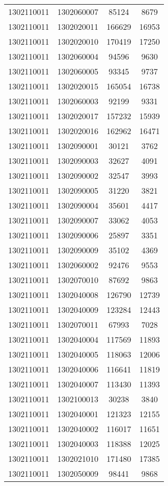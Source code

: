 \begin{longtable}{llcc}
1302110011 & 1302060007 & 85124 & 8679\\
1302110011 & 1302020011 & 166629 & 16953\\
1302110011 & 1302020010 & 170419 & 17250\\
1302110011 & 1302060004 & 94596 & 9630\\
1302110011 & 1302060005 & 93345 & 9737\\
1302110011 & 1302020015 & 165054 & 16738\\
1302110011 & 1302060003 & 92199 & 9331\\
1302110011 & 1302020017 & 157232 & 15939\\
1302110011 & 1302020016 & 162962 & 16471\\
1302110011 & 1302090001 & 30121 & 3762\\
1302110011 & 1302090003 & 32627 & 4091\\
1302110011 & 1302090002 & 32547 & 3993\\
1302110011 & 1302090005 & 31220 & 3821\\
1302110011 & 1302090004 & 35601 & 4417\\
1302110011 & 1302090007 & 33062 & 4053\\
1302110011 & 1302090006 & 25897 & 3351\\
1302110011 & 1302090009 & 35102 & 4369\\
1302110011 & 1302060002 & 92476 & 9553\\
1302110011 & 1302070010 & 87692 & 9863\\
1302110011 & 1302040008 & 126790 & 12739\\
1302110011 & 1302040009 & 123284 & 12443\\
1302110011 & 1302070011 & 67993 & 7028\\
1302110011 & 1302040004 & 117569 & 11893\\
1302110011 & 1302040005 & 118063 & 12006\\
1302110011 & 1302040006 & 116641 & 11819\\
1302110011 & 1302040007 & 113430 & 11393\\
1302110011 & 1302100013 & 30238 & 3840\\
1302110011 & 1302040001 & 121323 & 12155\\
1302110011 & 1302040002 & 116017 & 11651\\
1302110011 & 1302040003 & 118388 & 12025\\
1302110011 & 1302021010 & 171480 & 17385\\
1302110011 & 1302050009 & 98441 & 9868\\

\end{longtable}
